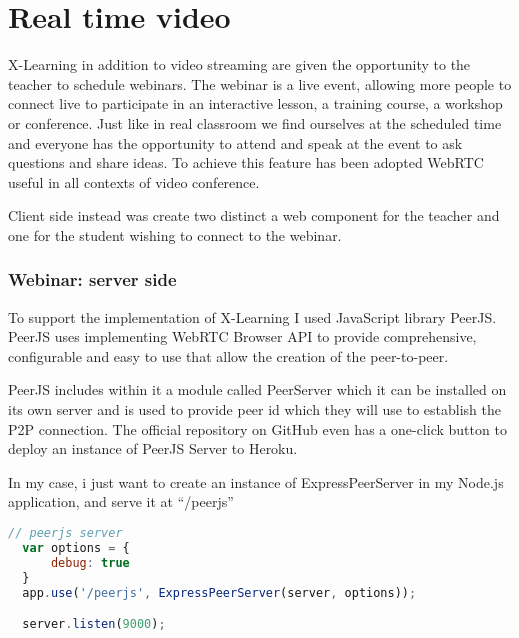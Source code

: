 \newpage
\section{Real time video}
\label{sec:RealTimeVideo}

X-Learning in addition to video streaming are given the opportunity to the teacher to schedule webinars.
The webinar is a live event, allowing more people to connect live to participate in an interactive lesson, a training course, a workshop or conference. Just like in real classroom we find ourselves at the scheduled time and everyone has the opportunity to attend and speak at the event to ask questions and share ideas.
To achieve this feature has been adopted WebRTC useful in all contexts of video conference.


Client side instead was create two distinct a web component for the teacher and one for the student wishing to connect to the webinar.

\subsubsection{Webinar: server side}
To support the implementation of X-Learning I used JavaScript library PeerJS.
PeerJS uses implementing WebRTC Browser API to provide comprehensive, configurable and easy to use that allow the creation of the peer-to-peer. 



PeerJS includes within it a module called PeerServer which it can be installed on its own server and is used to provide peer id which they will use to establish the P2P connection. The official repository on GitHub even has a one-click button to deploy an instance of PeerJS Server to Heroku.

In my case, i just want to create an instance of ExpressPeerServer in my Node.js application, and serve it at “/peerjs”

\begin{lstlisting}[language=javascript]
// peerjs server
  var options = {
      debug: true
  }
  app.use('/peerjs', ExpressPeerServer(server, options));

  server.listen(9000);
\end{lstlisting}

